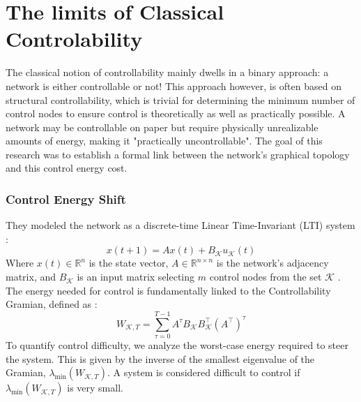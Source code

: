 \documentclass[10pt, a4paper]{article}
\begin{document}




\section{The limits of Classical Controlability}
The classical notion of controllability mainly dwells in a binary approach: a network is either controllable or not! This approach however, is often based on structural controllability, which is trivial for determining the minimum number of control nodes to ensure control is theoretically as well as practically possible. A network may be controllable on paper but require physically unrealizable amounts of energy, making it "practically uncontrollable". The goal of this research was to establish a formal link between the network's graphical topology and this control energy cost.
\subsubsection{Control Energy Shift}
They modeled the network as a discrete-time Linear Time-Invariant (LTI) system :
\begin{equation}
    x(t+1) = Ax(t) + B_{\mathcal{K}}u_{\mathcal{K}}(t)
    \label{eq:lti}
\end{equation}
Where $x(t) \in \mathbb{R}^n$ is the state vector, $A \in \mathbb{R}^{n \times n}$ is the network's adjacency matrix, and $B_{\mathcal{K}}$ is an input matrix selecting $m$ control nodes from the set $\mathcal{K}$ . The energy needed for control is fundamentally linked to the Controllability Gramian, defined as :
\begin{equation}
    W_{\mathcal{K},T} = \sum_{\tau=0}^{T-1}A^{\tau}B_{\mathcal{K}}B_{\mathcal{K}}^{\top}(A^{\top})^{\tau}
    \label{eq:gramian}
\end{equation}
To quantify control difficulty, we analyze the worst-case energy required to steer the system. This is given by the inverse of the smallest eigenvalue of the Gramian, $\lambda_{\min}(W_{\mathcal{K},T})$. A system is considered difficult to control if $\lambda_{\min}(W_{\mathcal{K},T})$ is very small.
\end{document}
